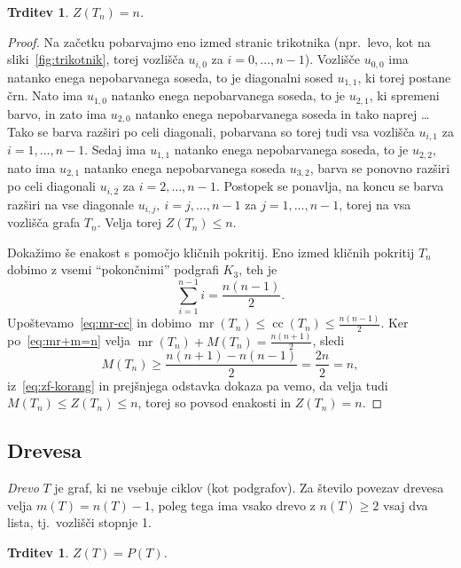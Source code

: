 \documentclass[12pt,a4paper,twoside]{article}
\theoremstyle{definition} %
\theoremstyle{plain} %
\newtheorem{trditev}[definicija]{Trditev}
\numberwithin{equation}{section}  %
\DeclareMathOperator{\mr}{mr}
\DeclareMathOperator{\cc}{cc}
\begin{document}
\begin{trditev}{{\cite[trditev 3.2]{aim2008minimumrank}}}
    $Z(T_n) = n$.
\end{trditev}
\begin{proof}
    Na začetku pobarvajmo eno izmed stranic trikotnika (npr.~levo, kot na sliki~\ref{fig:trikotnik}, torej vozlišča $u_{i,0}$ za $i = 0, \ldots, n-1$). Vozlišče $u_{0,0}$ ima natanko enega nepobarvanega soseda, to je diagonalni sosed $u_{1,1}$, ki torej postane črn. Nato ima $u_{1,0}$ natanko enega nepobarvanega soseda, to je $u_{2,1}$, ki spremeni barvo, in zato ima $u_{2,0}$ natanko enega nepobarvanega soseda in tako naprej \ldots Tako se barva razširi po celi diagonali, pobarvana so torej tudi vsa vozlišča $u_{i,1}$ za $i = 1, \ldots, n-1$. Sedaj ima $u_{1,1}$ natanko enega nepobarvanega soseda, to je $u_{2,2}$, nato ima $u_{2,1}$ natanko enega nepobarvanega soseda $u_{3,2}$, barva se ponovno razširi po celi diagonali $u_{i,2}$ za $i = 2, \ldots, n-1$. Postopek se ponavlja, na koncu se barva razširi na vse diagonale $u_{i,j},\ i = j, \ldots, n-1$ za $j = 1, \ldots, n-1$, torej na vsa vozlišča grafa $T_n$. Velja torej $Z(T_n) \leq n$.
    
    Dokažimo še enakost s pomočjo kličnih pokritij. Eno izmed kličnih pokritij $T_n$ dobimo z vsemi ``pokončnimi'' podgrafi $K_3$, teh je
    \[ \sum_{i=1}^{n-1} i = \frac{n(n-1)}{2}. \]
    Upoštevamo~\eqref{eq:mr-cc} in dobimo $\mr(T_n) \leq \cc(T_n) \leq \frac{n(n-1)}{2}$.
    Ker po~\eqref{eq:mr+m=n} velja $\mr(T_n) + M(T_n) = \frac{n(n+1)}{2}$, sledi
    \[ M(T_n) \geq \frac{n(n+1) - n(n-1)}{2} = \frac{2n}{2} = n, \]
    iz~\eqref{eq:zf-korang} in prejšnjega odstavka dokaza pa vemo, da velja tudi $M(T_n) \leq Z(T_n) \leq n$, torej so povsod enakosti in $Z(T_n) = n$.
\end{proof}

\subsection{Drevesa}
\emph{Drevo} $T$ je graf, ki ne vsebuje ciklov (kot podgrafov). Za število povezav drevesa velja $m(T) = n(T) - 1$, poleg tega ima vsako drevo z $n(T) \geq 2$ vsaj dva lista, tj.~vozlišči stopnje 1.

\begin{trditev}{{\cite[trditev 4.2]{aim2008minimumrank}}}
    \label{trd:zf-dreves}
    $Z(T) = P(T)$.
\end{trditev}
\end{document}
